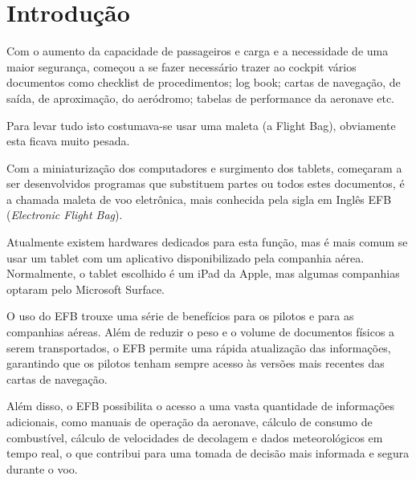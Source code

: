 \chapter{Introdução}
Com o aumento da capacidade de passageiros e carga e a necessidade 
de uma maior segurança, começou a se fazer necessário trazer ao cockpit 
vários documentos como checklist de procedimentos; log book; cartas de 
navegação, de saída, de aproximação, do aeródromo; tabelas de performance
 da aeronave etc.

Para levar tudo isto costumava-se usar uma maleta (a Flight Bag), obviamente 
esta ficava muito pesada.

Com a miniaturização dos computadores e surgimento dos tablets, começaram a ser 
desenvolvidos programas que substituem partes ou todos estes documentos, é a
chamada maleta de voo eletrônica, mais conhecida pela sigla em Inglês EFB 
(\textit{Electronic Flight Bag}).

Atualmente existem hardwares dedicados para esta função, mas é mais comum se 
usar um tablet com um aplicativo disponibilizado pela companhia aérea. Normalmente, 
o tablet escolhido é um iPad da Apple, mas algumas companhias optaram pelo 
Microsoft Surface. \cite{surface}

O uso do EFB trouxe uma série de benefícios para os pilotos e para as companhias
aéreas. Além de reduzir o peso e o volume de documentos físicos a serem 
transportados, o EFB permite uma rápida atualização das informações, garantindo
 que os pilotos tenham sempre acesso às versões mais recentes das cartas de 
 navegação. \cite{EFB-more-than}

Além disso, o EFB possibilita o acesso a uma vasta quantidade de informações 
adicionais, como manuais de operação da aeronave, cálculo de consumo de combustível,
cálculo de velocidades de decolagem e dados meteorológicos em tempo real, o que 
contribui para uma tomada de decisão mais informada e segura durante o voo.
